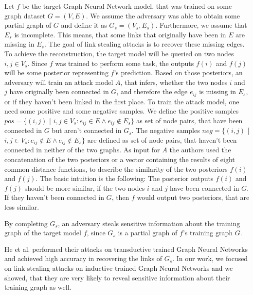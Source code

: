     Let $f$ be the target Graph Neural Network model, that was trained on some graph dataset $G = (V, E)$.
    We assume the adversary was able to obtain some partial graph of $G$ and define it as $G_s = (V_s, E_s)$.
    Furthermore, we assume that $E_s$ is incomplete.
    This means, that some links that originally have been in $E$ are missing in $E_s$.
    The goal of link stealing attacks is to recover these missing edges.
    To achieve the reconstruction, the target model will be queried on two nodes $i,j \in V_s$.
    Since $f$ was trained to perform some task, the outputs $f(i)$ and $f(j)$ will be some posterior representing $f$'s prediction.
    Based on those posteriors, an adversary will train an attack model $A$, that infers, whether the two nodes $i$ and $j$ have originally been connected in $G$, and therefore the edge $e_{ij}$ is missing in $E_s$, or if they haven't been linked in the first place.
    To train the attack model, one need some positive and some negative samples.
    We define the positive samples $pos = \{ (i,j)$ | $i,j \in V_s: e_{ij} \in E \wedge e_{ij} \not\in E_s\}$ as set of node pairs, that have been connected in $G$ but aren't connected in $G_s$. 
    The negative samples $neg = \{ (i,j)$ | $i,j \in V_s: e_{ij} \not\in E \wedge e_{ij} \not\in E_s\}$ are defined as set of node pairs, that haven't been connected in neither of the two graphs.
    As input for $A$ the authors used the concatenation of the two posteriors or a vector containing the results of eight common distance functions, to describe the similarity of the two posteriors $f(i)$ and $f(j)$.
    The basic intuition is the following: 
    The posterior outputs $f(i)$ and $f(j)$ should be more similar, if the two nodes $i$ and $j$ have been connected in $G$.
    If they haven't been connected in $G$, then $f$ would output two posteriors, that are less similar.

    By completing $G_s$, an adversary steals sensitive information about the training graph of the target model $f$, since $G_s$ is a partial graph of $f$'s training graph $G$.

    He et al. performed their attacks on transductive trained Graph Neural Networks and achieved high accuracy in recovering the links of $G_s$. 
    In our work, we focused on link stealing attacks on inductive trained Graph Neural Networks and we showed, that they are very likely to reveal sensitive information about their training graph as well.